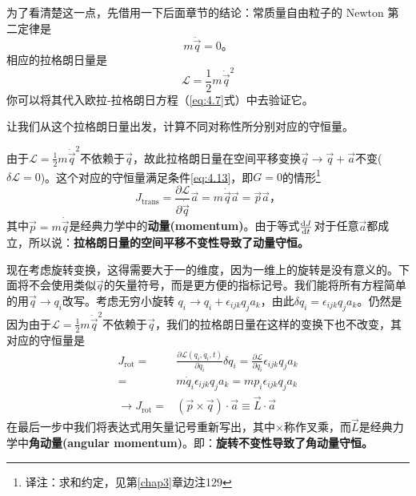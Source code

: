为了看清楚这一点，先借用一下后面章节的结论：常质量自由粒子的 Newton 第二定律是%
\begin{equation}
m{\ddot\vec{q}} = 0 \text{。}
\end{equation}
相应的拉格朗日量是%
\begin{equation}
{\mathcal L}=\frac{1}{2}m\dot\vec{q}^2
\end{equation}
你可以将其代入欧拉-拉格朗日方程（\ref{eq:4.7}式）中去验证它。

让我们从这个拉格朗日量出发，计算不同对称性所分别对应的守恒量。

由于${\mathcal L}=\frac{1}{2}m{\dot\vec q}^2$不依赖于$\vec q$，故此拉格朗日量在空间平移变换$\vec{q}\rightarrow\vec{q}+\vec{a}$不变($\delta{\mathcal L}=0$)。这个对应的守恒量满足条件\ref{eq:4.13}，即$G=0$的情形\footnote{译注：求和约定，见第\ref{chap3}章边注129}
\begin{equation}
J_\text{trans} = \frac{\partial\mathcal L}{\partial \dot\vec q} \vec a = m {\dot\vec q} {\vec a} = \vec{p}\vec{a} \text{，}
\end{equation}
其中$\vec{p}=m{\dot\vec q}$是经典力学中的{\bf 动量(momentum)}。由于等式$\frac{\mathrm d J}{\mathrm d t}$对于任意$\vec a$都成立，所以说：{\bf 拉格朗日量的空间平移不变性导致了动量守恒。}

现在考虑旋转变换，这得需要大于一的维度，因为一维上的旋转是没有意义的。下面将不会使用类似$\vec q$的矢量符号，而是更方便的指标记号。我们能将所有方程简单的用$\vec{q}\rightarrow q_i$改写。考虑无穷小旋转%
%
$q_i \rightarrow q_i + \epsilon_{ijk} q_j a_k$，由此$\delta q_i=\epsilon_{ijk}q_j a_k$。仍然是因为由于${\mathcal L}=\frac{1}{2}m{\dot\vec q}^2$不依赖于$\vec q$，我们的拉格朗日量在这样的变换下也不改变，其对应的守恒量是%
\begin{equation}
\begin{aligned}
J_\text{rot} =& \frac{\partial {\mathcal L}(q_i, \dot q_i, t)}{\partial \dot q_i}\delta q_i  = \frac{\partial \mathcal L}{\partial \dot q_i} \epsilon_{ijk} q_j a_k \\
  =& m {\dot q_i} \epsilon_{ijk} q_j a_k = m p_i\epsilon_{ijk} q_j a_k \\
  \rightarrow J_\text{rot} =& (\vec{p}\times\vec{q})\cdot\vec{a} \equiv \vec{L}\cdot\vec{a}
\end{aligned}
\end{equation}
在最后一步中我们将表达式用矢量记号重新写出，其中$\times$称作叉乘，而$\vec L$是经典力学中{\bf 角动量(angular momentum)}。即：{\bf 旋转不变性导致了角动量守恒。}

